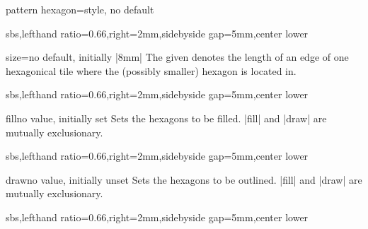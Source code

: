 \documentclass[a4paper,11pt]{article}
\begin{document}
\begin{myvoid}
\begin{docTikzKey}{pattern hexagon}{=}{style, no default}
\begin{dispExample*}{sbs,lefthand ratio=0.66,right=2mm,sidebyside gap=5mm,center lower}
\end{dispExample*}
\end{docTikzKey}

\clearpage

\begin{docPatternKey}[][doc label=size@hex]{size}{=}{no default, initially |8mm|}
  The given  denotes the length of an edge of one hexagonical tile
  where the (possibly smaller) hexagon is located in.
\begin{dispExample*}{sbs,lefthand ratio=0.66,right=2mm,sidebyside gap=5mm,center lower}
\end{dispExample*}
\end{docPatternKey}



\begin{docPatternKey}[][doc label=fill@hex]{fill}{}{no value, initially set}
  Sets the hexagons to be filled. |fill| and |draw| are mutually exclusionary.
\begin{dispExample*}{sbs,lefthand ratio=0.66,right=2mm,sidebyside gap=5mm,center lower}
\end{dispExample*}
\end{docPatternKey}


\begin{docPatternKey}[][doc label=draw@hex]{draw}{}{no value, initially unset}
  Sets the hexagons to be outlined. |fill| and |draw| are mutually exclusionary.
\begin{dispExample*}{sbs,lefthand ratio=0.66,right=2mm,sidebyside gap=5mm,center lower}
\end{dispExample*}
\end{docPatternKey}



\end{myvoid}
\end{document}
